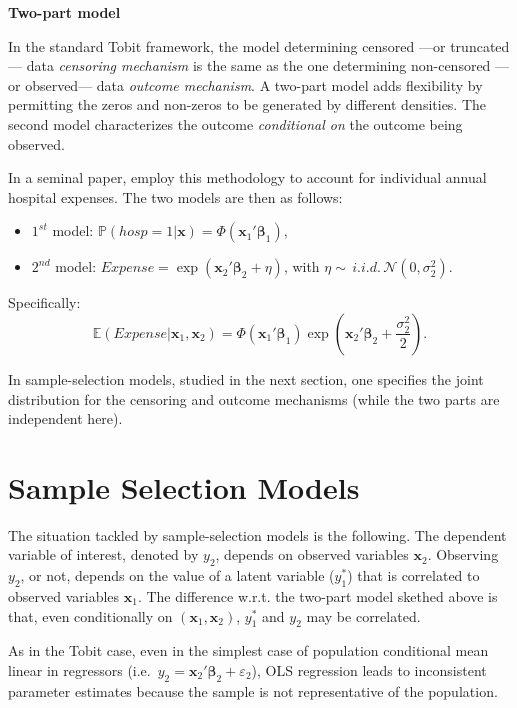 \documentclass[
  12pt,
]{book}
\providecommand{\tightlist}{%
  \setlength{\itemsep}{0pt}\setlength{\parskip}{0pt}}
\theoremstyle{definition}
\theoremstyle{definition}
\theoremstyle{definition}
\theoremstyle{definition}
\theoremstyle{remark}
\begin{document}
\textbf{Two-part model}

In the standard Tobit framework, the model determining censored ---or truncated--- data \emph{censoring mechanism} is the same as the one determining non-censored ---or observed--- data \emph{outcome mechanism}. A two-part model adds flexibility by permitting the zeros and non-zeros to be generated by different densities. The second model characterizes the outcome \emph{conditional on} the outcome being observed.

In a seminal paper, \citet{Duan_et_al_1983} employ this methodology to account for individual annual hospital expenses. The two models are then as follows:

\begin{itemize}
\tightlist
\item
  \(1^{st}\) model: \(\mathbb{P}(hosp=1|\mathbf{x}) = \Phi(\mathbf{x}_1'\boldsymbol\beta_1)\),
\item
  \(2^{nd}\) model: \(Expense = \exp(\mathbf{x}_2'\boldsymbol\beta_2 + \eta)\), with \(\eta \sim\,i.i.d.\, \mathcal{N}(0,\sigma_2^2)\).
\end{itemize}

Specifically:
\[
\mathbb{E}(Expense|\mathbf{x}_1,\mathbf{x}_2) = \Phi(\mathbf{x}_1'\boldsymbol\beta_1)\exp\left(\mathbf{x}_2'\boldsymbol\beta_2+ \frac{\sigma_2^2}{2}\right).
\]

In sample-selection models, studied in the next section, one specifies the joint distribution for the censoring and outcome mechanisms (while the two parts are independent here).

\hypertarget{SSM}{%
\section{Sample Selection Models}\label{SSM}}

The situation tackled by sample-selection models is the following. The dependent variable of interest, denoted by \(y_2\), depends on observed variables \(\mathbf{x}_2\). Observing \(y_2\), or not, depends on the value of a latent variable (\(y_1^*\)) that is correlated to observed variables \(\mathbf{x}_1\). The difference w.r.t. the two-part model skethed above is that, even conditionally on \((\mathbf{x}_1,\mathbf{x}_2)\), \(y_1^*\) and \(y_2\) may be correlated.

As in the Tobit case, even in the simplest case of population conditional mean linear in regressors (i.e.~\(y_2 = \mathbf{x}_2'\boldsymbol\beta_2 + \varepsilon_2\)), OLS regression leads to inconsistent parameter estimates because the sample is not representative of the population.
\end{document}
